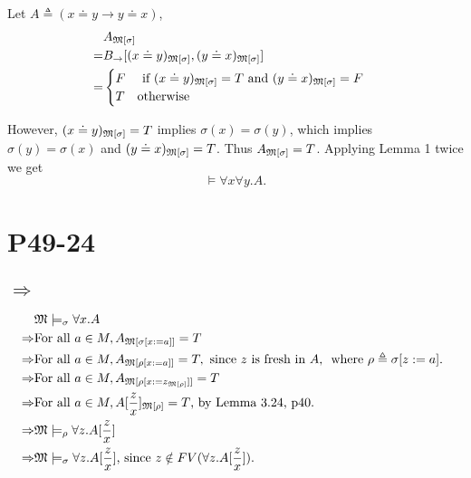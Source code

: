 \documentclass{article}
\begin{document}
Let $A \triangleq (x \doteq y \rightarrow y \doteq x)$, 
\begin{align*}
	 &A_{\frak{M}[\sigma]}\\
	=&B_\rightarrow[(x \doteq y)_{\frak{M}[\sigma]}, (y \doteq x) _{\frak{M}[\sigma]}]\\
	=&\begin{cases}
		F \quad \mbox{ if } (x \doteq y)_{\frak{M}[\sigma]} = T \mbox{ and } (y \doteq x)_{\frak{M}[\sigma]} = F\\
		T \quad \mbox{otherwise}%
	 \end{cases}\\
\end{align*}

However, $(x\doteq y)_{\frak{M}[\sigma]} = T$ implies $\sigma(x) = \sigma(y)$, which implies $\sigma(y) = \sigma(x)$ and $(y \doteq x)_{\frak{M}[\sigma]} = T$. Thus $A _{\frak{M}[\sigma]} = T$. Applying Lemma 1 twice we get $$\models \forall x \forall y. A.$$ 

\section{P49-24}
\subsection*{$\Rightarrow$}
\begin{align*}
	& \frak{M} \models _\sigma \forall x. A\\
	\Rightarrow & \text{For all }a \in M, A_{\frak{M}[\sigma[x:=a]]} = T\\
	\Rightarrow & \text{For all }a \in M, A_{\frak{M} [\rho[x:=a]]} = T, \text{ since $z$ is fresh in $A$, } \text{ where $\rho \triangleq \sigma[z:=a]$. } \\
	\Rightarrow & \text{For all }a \in M, A_{\frak{M} [\rho[x := z_{\frak{M} [\rho]}]]} = T\\
	\Rightarrow & \text{For all }a \in M, A[\frac{z}{x}]_{\frak{M} [\rho]} = T \text{, by Lemma 3.24, p40. }  \\
	\Rightarrow &\frak{M} \models _\rho\forall z. A[\frac{z}{x}] \\
	\Rightarrow &\frak{M} \models _\sigma\forall z. A[\frac{z}{x}] \text{, since $z \notin FV(\forall z. A[\frac{z}{x}])$. }
\end{align*}
\end{document}
